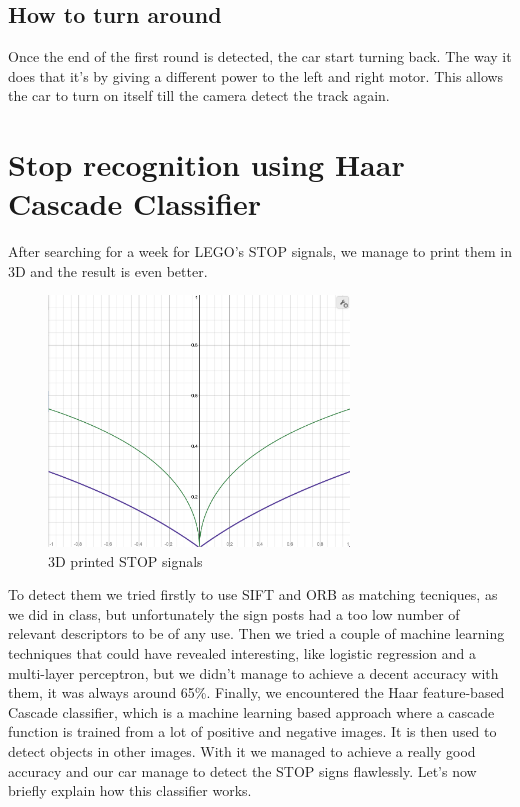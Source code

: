 \documentclass[12pt,a4paper]{article}
\begin{document}
\begin{large}
\subsection{How to turn around}
Once the end of the first round is detected, the car start turning back. The way it does that it's by giving a different power to the left and right motor. This allows the car to turn on itself till the camera detect the track again.\\


\section{Stop recognition using Haar Cascade Classifier}
After searching for a week for LEGO's STOP signals, we manage to print them in 3D and the result is even better.\par
\begin{figure} [!h]
  \centering
  \captionsetup{justification=centering}
  \includegraphics[width=8cm]{images/logx.png}
  \caption{3D printed STOP signals}
  \end{figure}
To detect them we tried firstly to use SIFT and ORB as matching tecniques, as we did in class, but unfortunately the sign posts had a too low number of relevant descriptors to be of any use.
Then we tried a couple of machine learning techniques that could have revealed interesting, like logistic regression and a multi-layer perceptron, but we didn't manage to achieve a decent accuracy with them, it was always around 65\%.
Finally, we encountered the Haar feature-based Cascade classifier, which is a machine learning based approach where a cascade function is trained from a lot of positive and negative images. It is then used to detect objects in other images. With it we managed to achieve a really good accuracy and our car manage to detect the STOP signs flawlessly. Let's now briefly explain how this classifier works.



\end{large}
\end{document}

